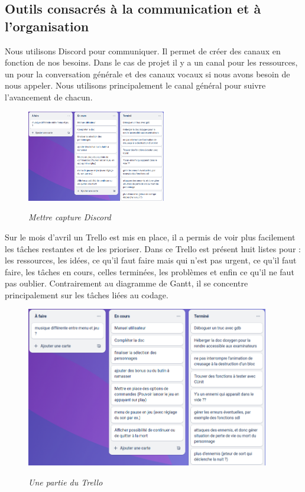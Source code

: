 \documentclass[a4paper,12pt]{article}
\begin{document}
\subsection{Outils consacrés à la communication et à l'organisation}
Nous utilisons Discord pour communiquer. 
Il permet de créer des canaux en fonction de nos besoins. 
Dans le cas de projet il y a un canal pour les ressources, un pour la conversation générale et des canaux vocaux si nous avons besoin de nous appeler. 
Nous utilisons principalement le canal général pour suivre l’avancement de chacun.

\begin{figure}[h]
\begin{center}
\includegraphics[height=4cm]{img/capture_trello.png}\\
\caption{{\emph{Mettre capture Discord}}}
\label{discord}
\end{center}
\end{figure}

Sur le mois d’avril un Trello est mis en place, il a permis de voir plus facilement les tâches restantes et de les prioriser. 
Dans ce Trello est présent huit listes pour : les ressources, les idées, ce qu’il faut faire mais qui n’est pas urgent, ce qu’il faut faire, les tâches en cours, celles terminées, les problèmes et enfin ce qu’il ne faut pas oublier. 
Contrairement au diagramme de Gantt, il se concentre principalement sur les tâches liées au codage.

\begin{figure}[h]
\begin{center}
\includegraphics[height=7cm]{img/capture_trello.png}\\
\caption{{\emph{Une partie du Trello}}}
\label{trello}
\end{center}
\end{figure}
\end{document}
